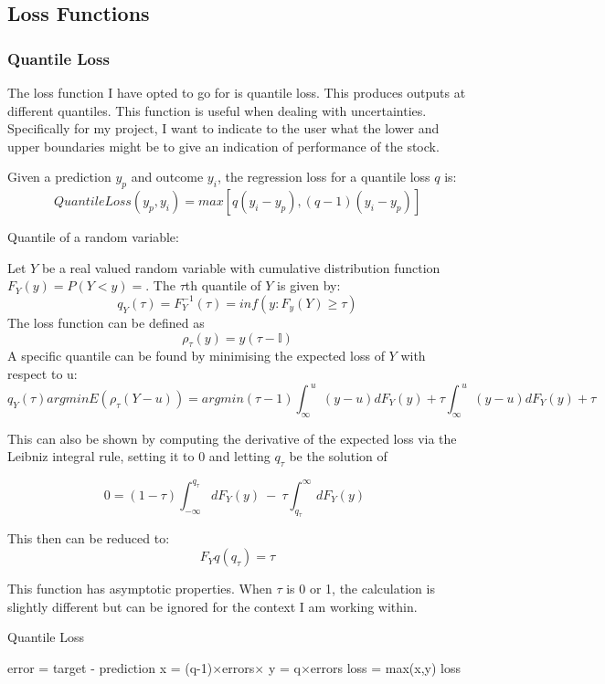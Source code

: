 \documentclass{article}
\begin{document}
\subsection{Loss Functions}

\subsubsection{Quantile Loss}
The loss function I have opted to go for is quantile loss. This produces outputs
at different quantiles. This function is useful when dealing with uncertainties.
Specifically for my project, I want to indicate to the user what the lower and
upper boundaries might be to give an indication of performance of the stock.

Given a prediction $y_p$ and outcome $y_i$, the regression loss for a quantile
loss $q$ is:
$$QuantileLoss(y_p,y_i) = max[q(y_i -y_p),(q-1)(y_i - y_p)]$$

Quantile of a random variable:

Let $Y$ be a real valued random variable with cumulative distribution function
$ F_Y(y) = P(Y<y)=$. The $\tau$th quantile of $Y$ is given by:
$$q_Y(\tau) = F^{-1}_Y(\tau) = inf(y:F_y(Y)\geq \tau ) $$
The loss function can be defined as $$\rho_{\tau}(y) = y(\tau - \mathbb{I})$$
A specific quantile can be found by minimising the expected loss of $Y$ with
respect to u:
$$q_Y(\tau) arg min E(\rho_{\tau}(Y - u)) = arg min {(\tau -1) \int _{\infty \:}^{\:u}\left(y-u\right)dF_Y\left(y\right)+\tau \int _{\infty \:}^{\:u}\left(y-u\right)dF_Y\left(y\right)+\tau } $$


This can also be shown by computing the derivative of the expected loss via
the Leibniz integral rule, setting it to 0 and letting $q_{\tau}$ be the solution
of

$$0 = \left(1-\tau \right)\int _{-\infty }^{q_{\tau }}dF_Y\left(y\right)\:-\:\tau \int _{q_{\tau }}^{\infty \:}dF_Y\left(y\right)\:\: $$

This then can be reduced to:
$$F_Yq(q_{\tau}) = \tau$$

This function has asymptotic properties. When $\tau$ is 0 or 1, the calculation
is slightly different but can be ignored for the context I am working within.


\begin{algorithm}
    \caption{Quantile Loss}
    \begin{algorithmic}[1]
        \State error = target - prediction
        \State x = (q-1)$\times$errors$\times$
        \State y = q$\times$errors
        \State loss = max(x,y)
    \EndFor
    \State \Return loss

    \end{algorithmic}
\end{algorithm}
\end{document}
